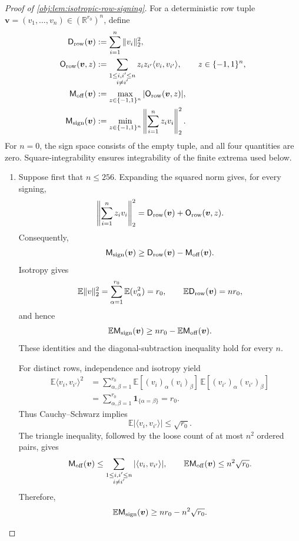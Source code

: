 \begin{proof}[Proof of \cref{obj:lem:isotropic-row-signing}]
For a deterministic row tuple \(\boldsymbol v=(v_1,\ldots,v_n)\in(\mathbb R^{r_0})^n\), define
\[
\begin{aligned}
\mathsf D_{\rm row}(\boldsymbol v)
&:=\sum_{i=1}^n\|v_i\|_2^2,\\
\mathsf O_{\rm row}(\boldsymbol v,z)
&:=\sum_{\substack{1\leq i,i'\leq n\\i\ne i'}}
z_i z_{i'}\langle v_i,v_{i'}\rangle,
\qquad z\in\{-1,1\}^n,\\
\mathsf M_{\rm off}(\boldsymbol v)
&:=\max_{z\in\{-1,1\}^n}
|\mathsf O_{\rm row}(\boldsymbol v,z)|,\\
\mathsf M_{\rm sign}(\boldsymbol v)
&:=\min_{z\in\{-1,1\}^n}
\left\|\sum_{i=1}^n z_i v_i\right\|_2^2.
\end{aligned}
\]
For \(n=0\), the sign space consists of the empty tuple, and all four quantities are zero. Square-integrability ensures integrability of the finite extrema used below.

\begin{enumerate}
\item Suppose first that \(n\leq256\).
Expanding the squared norm gives, for every signing,
\[
\left\|\sum_{i=1}^n z_i v_i\right\|_2^2
=\mathsf D_{\rm row}(\boldsymbol v)
+\mathsf O_{\rm row}(\boldsymbol v,z).
\]
Consequently,
\[
\mathsf M_{\rm sign}(\boldsymbol v)
\geq\mathsf D_{\rm row}(\boldsymbol v)
-\mathsf M_{\rm off}(\boldsymbol v).
\]
Isotropy gives
\[
\mathbb E\|v\|_2^2
=\sum_{\alpha=1}^{r_0}\mathbb E(v_\alpha^2)=r_0,
\qquad
\mathbb E\mathsf D_{\rm row}(\boldsymbol v)=nr_0,
\]
and hence
\[
\mathbb E\mathsf M_{\rm sign}(\boldsymbol v)
\geq nr_0-\mathbb E\mathsf M_{\rm off}(\boldsymbol v).
\]
These identities and the diagonal-subtraction inequality hold for every \(n\).

For distinct rows, independence and isotropy yield
\[
\begin{aligned}
\mathbb E\langle v_i,v_{i'}\rangle^2
&=\sum_{\alpha,\beta=1}^{r_0}
\mathbb E[(v_i)_\alpha(v_i)_\beta]\,
\mathbb E[(v_{i'})_\alpha(v_{i'})_\beta]\\
&=\sum_{\alpha,\beta=1}^{r_0}\mathbf 1_{\{\alpha=\beta\}}
=r_0.
\end{aligned}
\]
Thus Cauchy--Schwarz implies
\[
\mathbb E|\langle v_i,v_{i'}\rangle|
\leq\sqrt{r_0}.
\]
The triangle inequality, followed by the loose count of at most \(n^2\) ordered pairs, gives
\[
\mathsf M_{\rm off}(\boldsymbol v)
\leq\sum_{\substack{1\leq i,i'\leq n\\i\ne i'}}
|\langle v_i,v_{i'}\rangle|,
\qquad
\mathbb E\mathsf M_{\rm off}(\boldsymbol v)
\leq n^2\sqrt{r_0}.
\]
Therefore,
\[
\mathbb E\mathsf M_{\rm sign}(\boldsymbol v)
\geq nr_0-n^2\sqrt{r_0}.
\]


\end{enumerate}
\end{proof}
